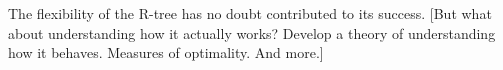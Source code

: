 The flexibility of the R-tree has no doubt contributed to its success.
[But what about understanding how it actually works?
Develop a theory of understanding how it behaves.
Measures of optimality.
And more.]

